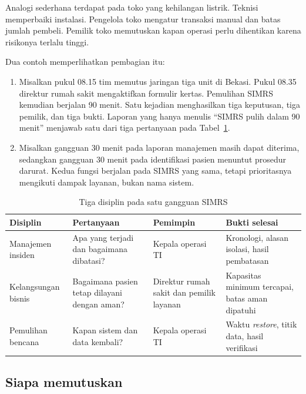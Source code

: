 Analogi sederhana terdapat pada toko yang kehilangan listrik. Teknisi memperbaiki instalasi.
Pengelola toko mengatur transaksi manual dan batas jumlah pembeli. Pemilik toko memutuskan kapan
operasi perlu dihentikan karena risikonya terlalu tinggi.

Dua contoh memperlihatkan pembagian itu:
\begin{enumerate}
  \item Misalkan pukul 08.15 tim memutus jaringan tiga unit di Bekasi. Pukul 08.35 direktur
  rumah sakit mengaktifkan formulir kertas. Pemulihan SIMRS kemudian berjalan 90 menit. Satu
  kejadian menghasilkan tiga keputusan, tiga pemilik, dan tiga bukti. Laporan yang hanya menulis
  ``SIMRS pulih dalam 90 menit'' menjawab satu dari tiga pertanyaan pada
  Tabel~\ref{tab:ch10-tiga-disiplin}.
  \item Misalkan gangguan 30 menit pada laporan manajemen masih dapat diterima, sedangkan
  gangguan 30 menit pada identifikasi pasien menuntut prosedur darurat. Kedua fungsi berjalan
  pada SIMRS yang sama, tetapi prioritasnya mengikuti dampak layanan, bukan nama sistem.
\end{enumerate}

\begin{table}[!htb]
  \centering\small
  \caption{Tiga disiplin pada satu gangguan SIMRS}\label{tab:ch10-tiga-disiplin}
  \begin{tabularx}{\textwidth}{|>{\raggedright\arraybackslash}p{}|>{\raggedright\arraybackslash}X|>{\raggedright\arraybackslash}p{}|>{\raggedright\arraybackslash}X|}
    \hline
    \textbf{Disiplin} & \textbf{Pertanyaan} & \textbf{Pemimpin} & \textbf{Bukti selesai} \\
    \hline
    Manajemen insiden & Apa yang terjadi dan bagaimana dibatasi? & Kepala operasi TI &
    Kronologi, alasan isolasi, hasil pembatasan \\ \hline
    Kelangsungan bisnis & Bagaimana pasien tetap dilayani dengan aman? & Direktur rumah sakit
    dan pemilik layanan & Kapasitas minimum tercapai, batas aman dipatuhi \\ \hline
    Pemulihan bencana & Kapan sistem dan data kembali? & Kepala operasi TI & Waktu
    \textit{restore}, titik data, hasil verifikasi \\ \hline
  \end{tabularx}
\end{table}

\subsection*{Siapa memutuskan}


